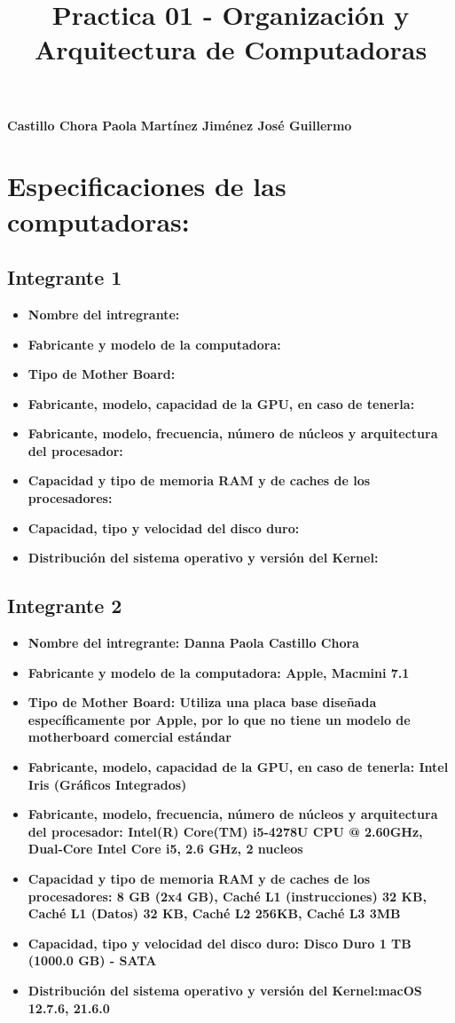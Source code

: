 \documentclass[12pt]{article}
\newcommand{\pl}[1]{\item \textbf{ #1 }}
\begin{document}

%

\title{Practica 01 - Organización y Arquitectura de Computadoras}
\begin{center}
    \textbf{Castillo Chora Paola}
    \textbf{Martínez Jiménez José Guillermo}
    
\end{center}

\section{Especificaciones de las computadoras:}
\subsection{Integrante 1}
\begin{itemize}
    \pl{Nombre del intregrante:}

    \pl{Fabricante y modelo de la computadora:}

    \pl{Tipo de Mother Board:}

    \pl{Fabricante, modelo, capacidad de la GPU, en caso de tenerla:}

    \pl{Fabricante, modelo, frecuencia, número de núcleos y arquitectura del procesador:}

    \pl{Capacidad y tipo de memoria RAM y de caches de los procesadores:}

    \pl{Capacidad, tipo y velocidad del disco duro:}

    \pl{Distribución del sistema operativo y versión del Kernel:}
\end{itemize}


\subsection{Integrante 2}
\begin{itemize}
    \pl{Nombre del intregrante: Danna Paola Castillo Chora}

    \pl{Fabricante y modelo de la computadora: Apple, Macmini 7.1}

    \pl{Tipo de Mother Board: Utiliza una placa base diseñada específicamente por Apple, por lo que no tiene un modelo de motherboard comercial estándar}

    \pl{Fabricante, modelo, capacidad de la GPU, en caso de tenerla: Intel Iris (Gráficos Integrados)}

    \pl{Fabricante, modelo, frecuencia, número de núcleos y arquitectura del procesador: Intel(R) Core(TM) i5-4278U CPU @ 2.60GHz, Dual-Core Intel Core i5, 2.6 GHz, 2 nucleos}

    \pl{Capacidad y tipo de memoria RAM y de caches de los procesadores: 8 GB (2x4 GB), Caché L1 (instrucciones) 32 KB, Caché L1 (Datos) 32 KB, Caché L2 256KB, Caché L3 3MB}

    \pl{Capacidad, tipo y velocidad del disco duro: Disco Duro
1 TB (1000.0 GB) - SATA}

    \pl{Distribución del sistema operativo y versión del Kernel:macOS 12.7.6, 21.6.0}
\end{itemize}
\end{document}
